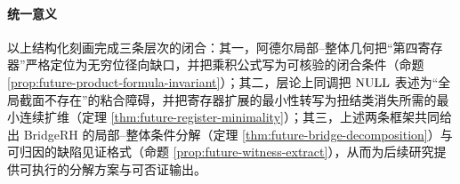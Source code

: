 \paragraph{统一意义}
以上结构化刻画完成三条层次的闭合：其一，阿德尔局部--整体几何把“第四寄存器”严格定位为无穷位径向缺口，并把乘积公式写为可核验的闭合条件（命题 \ref{prop:future-product-formula-invariant}）；其二，层论上同调把 $\mathrm{NULL}$ 表述为“全局截面不存在”的粘合障碍，并把寄存器扩展的最小性转写为扭结类消失所需的最小连续扩维（定理 \ref{thm:future-register-minimality}）；其三，上述两条框架共同给出 BridgeRH 的局部--整体条件分解（定理 \ref{thm:future-bridge-decomposition}）与可归因的缺陷见证格式（命题 \ref{prop:future-witness-extract}），从而为后续研究提供可执行的分解方案与可否证输出。

